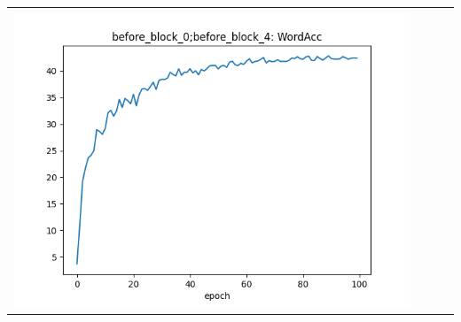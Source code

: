 \begin{longtable}{cccc}
\includegraphics[scale=0.2]{./images/mixup_position/before_block_0;before_block_4_WordAcc.png}\\

\end{longtable}
